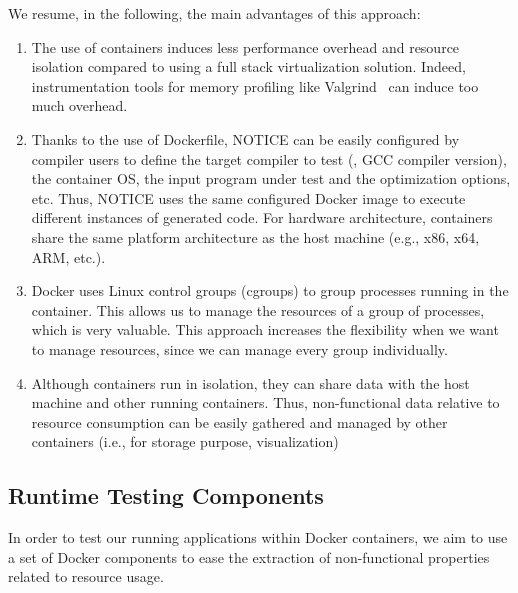 We resume, in the following, the main advantages of this approach:
\begin{enumerate}
	\item The use of containers induces less performance overhead and resource isolation compared to using a full stack virtualization solution. Indeed, instrumentation tools for memory profiling like Valgrind~\cite{nethercote2007valgrind} can induce too much overhead.
	\item Thanks to the use of Dockerfile, NOTICE can be easily configured by compiler users to define the target compiler to test (\eg, GCC compiler version), the container OS, the input program under test and the optimization options, etc. Thus, NOTICE uses the same configured Docker image to execute different instances of generated code. For hardware architecture, containers share the same platform architecture as the host machine (e.g., x86, x64, ARM, etc.). 
	\item Docker uses Linux control groups (cgroups) to group processes running in the container. This allows us to manage the resources of a group of processes, which is very valuable. 
	This approach increases the flexibility when we want to manage resources, since we can manage every group individually. 
	\item Although containers run in isolation, they can share data with the host machine and other running containers. Thus, non-functional data relative to resource consumption can be easily gathered and managed by other containers (i.e., for storage purpose, visualization)
\end{enumerate}


\subsection{Runtime Testing Components}
In order to test our running applications within Docker containers, we aim to use a set of Docker components to ease the extraction of non-functional properties related to resource usage.
